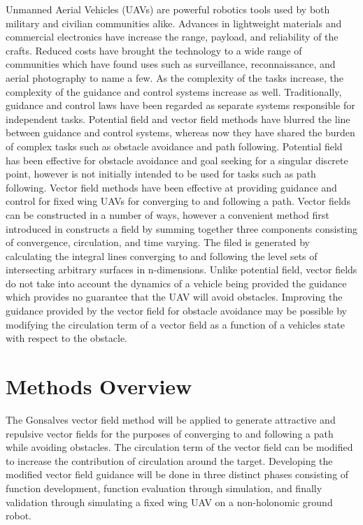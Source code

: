 \documentclass[numbered,pdftex]{ohio-etd}
\begin{document}
Unmanned Aerial Vehicles (UAVs) are powerful robotics tools used by both military and civilian communities alike. Advances in lightweight materials and commercial electronics have increase the range, payload, and reliability of the crafts. Reduced costs have brought the technology to a wide range of communities which have found uses such as surveillance, reconnaissance, and aerial photography to name a few. As the complexity of the tasks increase, the complexity of the guidance and control systems increase as well. Traditionally, guidance and control laws have been regarded as separate systems responsible for independent tasks. Potential field and vector field methods have blurred the line between guidance and control systems, whereas now they have shared the burden of complex tasks such as obstacle avoidance and path following. Potential field has been effective for obstacle avoidance and goal seeking for a singular discrete point, however is not initially intended to be used for tasks such as path following. Vector field methods have been effective at providing guidance and control for fixed wing UAVs for converging to and following a path. Vector fields can be constructed in a number of ways, however a convenient method first introduced in \cite{goncalves_artificial_2009} constructs a field by summing together three components consisting of convergence, circulation, and time varying. The filed is generated by calculating the integral lines converging to and following the level sets of intersecting arbitrary surfaces in n-dimensions. Unlike potential field, vector fields do not take into account the dynamics of a vehicle being provided the guidance which provides no guarantee that the UAV will avoid obstacles. Improving the guidance provided by the vector field for obstacle avoidance may be possible by modifying the circulation term of a vector field as a function of a vehicles state with respect to the obstacle.

\section{Methods Overview}
The Gonsalves vector field method will be applied to generate attractive and repulsive vector fields for the purposes of converging to and following a path while avoiding obstacles. The circulation term of the vector field can be modified to increase the contribution of circulation around the target. Developing the modified vector field guidance will be done in three distinct phases consisting of function development, function evaluation through simulation, and finally validation through simulating a fixed wing UAV on a non-holonomic ground robot.
\end{document}
